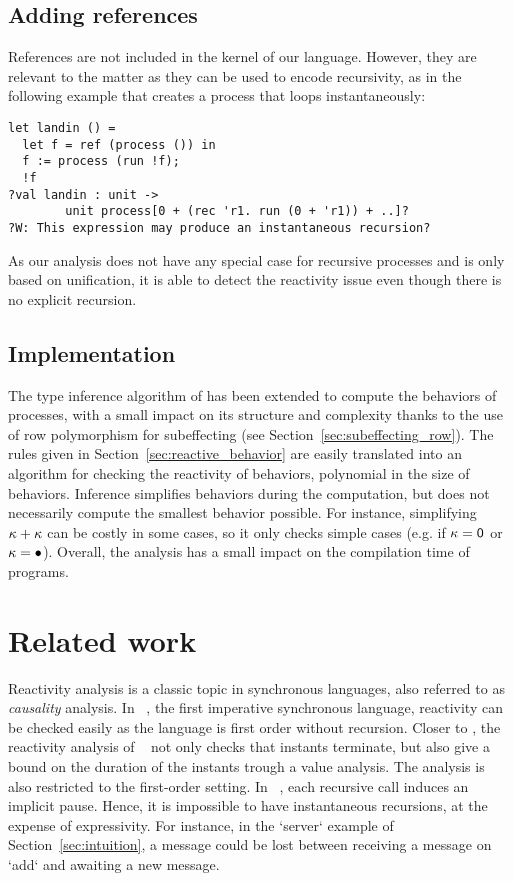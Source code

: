 \documentclass[9pt,preprint]{sigplanconf}
\begin{document}
\subsection{Adding references}

References are not included in the kernel of our language. However, they are relevant to the matter as they can be used to encode recursivity, as in the following example that creates a process that loops instantaneously:
%
\begin{lstlisting}
let landin () =
  let f = ref (process ()) in
  f := process (run !f);
  !f
?val landin : unit -> 
        unit process[0 + (rec 'r1. run (0 + 'r1)) + ..]?
?W: This expression may produce an instantaneous recursion?
\end{lstlisting}
%
As our analysis does not have any special case for recursive processes and is only based on unification, it is able to detect the reactivity issue even though there is no explicit recursion.

\subsection{Implementation}

The type inference algorithm of \rml has been extended to compute the behaviors of processes, with a small impact on its structure and complexity thanks to the use of row polymorphism for subeffecting (see Section~\ref{sec:subeffecting_row}). The rules given in Section~\ref{sec:reactive_behavior} are easily translated into an algorithm for checking the reactivity of behaviors, polynomial in the size of behaviors. Inference simplifies behaviors during the computation, but does not necessarily compute the smallest behavior possible. For instance, simplifying $\kappa + \kappa$ can be costly in some cases, so it only checks simple cases (e.g. if $\kappa = \textsf{0}$ or $\kappa = \bullet$). Overall, the analysis has a small impact on the compilation time of \rml programs.

\section{Related work}
\label{sec:related_work}

Reactivity analysis is a classic topic in synchronous languages, also referred to as \emph{causality} analysis. In \esterel~\cite{Berry:1997}, the first imperative synchronous language, reactivity can be checked easily as the language is first order without recursion. Closer to \rml, the reactivity analysis of \funloft~\cite{Amadio:2007b} not only checks that instants terminate, but also give a bound on the duration of the instants trough a value analysis. The analysis is also restricted to the first-order setting. In \ulm~\cite{Boudol:2004}, each recursive call induces an implicit pause. Hence, it is impossible to have instantaneous recursions, at the expense of expressivity. For instance, in the `server` example of Section~\ref{sec:intuition}, a message could be lost between receiving a message on `add` and awaiting a new message.
\end{document}
